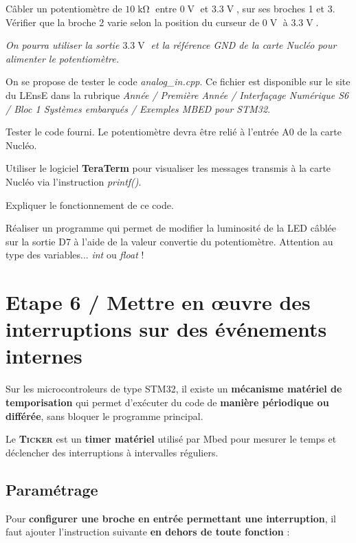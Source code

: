 \documentclass[a4paper,11pt,titlepage]{article} %
\begin{document}
\Manip Câbler un potentiomètre de $10\operatorname{k\Omega}$ entre $0\operatorname{V}$ et $3.3\operatorname{V}$, sur ses broches 1 et 3. Vérifier que la broche 2 varie selon la position du curseur de $0\operatorname{V}$ à $3.3\operatorname{V}$.

\textit{On pourra utiliser la sortie $3.3\operatorname{V}$ et la référence \textit{GND} de la carte Nucléo pour alimenter le potentiomètre.}

\bigskip

On se propose de tester le code \textsl{analog\_in.cpp}. Ce fichier est disponible sur le site du LEnsE dans la rubrique \textit{Année / Première Année / Interfaçage Numérique S6 / Bloc 1 Systèmes embarqués / Exemples MBED pour STM32}.

\Manip Tester le code fourni. Le potentiomètre devra être relié à l'entrée A0 de la carte Nucléo.

\Manip Utiliser le logiciel \textbf{TeraTerm} pour visualiser les messages transmis à la carte Nucléo via l'instruction \textsl{printf()}.

\Quest Expliquer le fonctionnement de ce code.

\Manip Réaliser un programme qui permet de modifier la luminosité de la LED câblée sur la sortie D7 à l'aide de la valeur convertie du potentiomètre. Attention au type des variables... \textit{int} ou \textit{float} !


\newpage
\section{Etape 6 / Mettre en \oe{}uvre des interruptions sur des événements internes}

Sur les microcontroleurs de type STM32, il existe un \textbf{mécanisme matériel de temporisation} qui permet d'exécuter du code de \textbf{manière périodique ou différée}, sans bloquer le programme principal.

Le \textbf{\textsc{Ticker}} est un \textbf{timer matériel} utilisé par Mbed pour mesurer le temps et déclencher des interruptions à intervalles réguliers. 


\subsection{Paramétrage}

Pour \textbf{configurer une broche en entrée permettant une interruption}, il faut ajouter l'instruction suivante \textbf{en dehors de toute fonction} :
\end{document}
